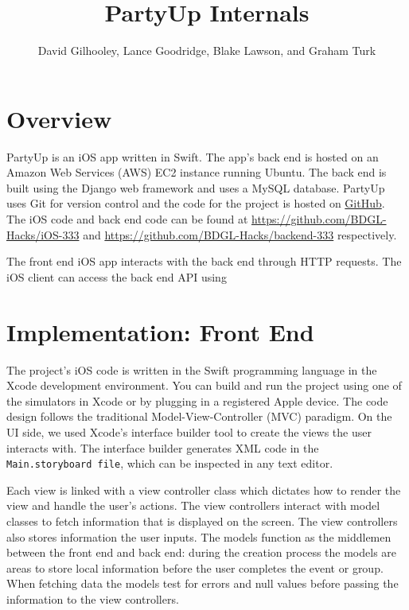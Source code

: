 \documentclass[12pt]{article}
\title{PartyUp Internals}
\author{David Gilhooley, Lance Goodridge, Blake Lawson, and Graham Turk}
\begin{document}
\pagestyle{plain}

\maketitle


\section{Overview}

PartyUp is an iOS app written in Swift.
The app's back end is hosted on an Amazon Web Services (AWS)
EC2 instance running Ubuntu.
The back end is built using the Django web framework and uses
a MySQL database.
PartyUp uses Git for version control and the code for the project is 
hosted on \href{https://github.com/}{GitHub}.
The iOS code and back end code can be found at 
\url{https://github.com/BDGL-Hacks/iOS-333} and
\url{https://github.com/BDGL-Hacks/backend-333} respectively.

The front end iOS app interacts with the back end through HTTP requests.
The iOS client can access the back end API using 


\section{Implementation: Front End}

The project's iOS code is written in the Swift programming language in the Xcode development environment.
You can build and run the project using one of the simulators in Xcode or
by plugging in a registered Apple device.
The code design follows the traditional Model-View-Controller (MVC) paradigm.
On the UI side, we used Xcode's interface builder tool to
create the views the user interacts with.
The interface builder generates XML code in the \texttt{Main.storyboard file},
which can be inspected in any text editor.

Each view is linked with a view controller class
which dictates how to render the view and handle the user's actions. 
The view controllers interact with model classes to fetch information 
that is displayed on the screen. 
The view controllers also stores information the user inputs. 
The models function as the middlemen between the front end and back end: 
during the creation process the models are areas to store local information 
before the user completes the event or group. When fetching data the models 
test for errors and null values before passing the information to the view controllers.
\end{document}
